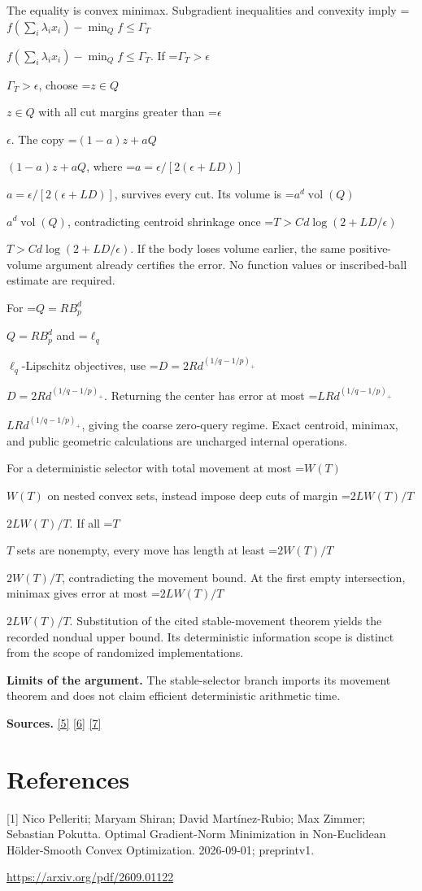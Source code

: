 \documentclass[10pt,a4paper]{article}
\newcommand{\AtlasMath}[1]{\par\begingroup\centering\setbox0=\hbox{$\displaystyle #1$}\ifdim\wd0>1.4\linewidth\typeout{ATLAS WIDE FORMULA: \the\wd0}\fi\ifdim\wd0>\linewidth\resizebox{\linewidth}{!}{\box0}\else\box0\fi\par\endgroup}
\newcommand{\AtlasInlineMath}[1]{\begingroup\setbox0=\hbox{$#1$}\ifdim\wd0>.4\linewidth\endgroup\AtlasMath{#1}\else\endgroup$#1$\fi}
\begin{document}
The equality is convex minimax. Subgradient inequalities and convexity imply
\AtlasInlineMath{f(\sum_i\lambda_ix_i)-\min_Qf\le\Gamma_T}.
If \AtlasInlineMath{\Gamma_T>\epsilon}, choose \AtlasInlineMath{z\in Q} with all cut margins greater than \AtlasInlineMath{\epsilon}. The copy \AtlasInlineMath{(1-a)z+aQ}, where \AtlasInlineMath{a=\epsilon/[2(\epsilon+LD)]}, survives every cut. Its volume is \AtlasInlineMath{a^d\operatorname{vol}(Q)}, contradicting centroid shrinkage once \AtlasInlineMath{T>C d\log(2+LD/\epsilon)}. If the body loses volume earlier, the same positive-volume argument already certifies the error. No function values or inscribed-ball estimate are required.

For \AtlasInlineMath{Q=RB_p^d} and \AtlasInlineMath{\ell_q}-Lipschitz objectives, use \AtlasInlineMath{D=2Rd^{(1/q-1/p)_+}}. Returning the center has error at most \AtlasInlineMath{LRd^{(1/q-1/p)_+}}, giving the coarse zero-query regime. Exact centroid, minimax, and public geometric calculations are uncharged internal operations.

For a deterministic selector with total movement at most \AtlasInlineMath{W(T)} on nested convex sets, instead impose deep cuts of margin \AtlasInlineMath{2LW(T)/T}. If all \AtlasInlineMath{T} sets are nonempty, every move has length at least \AtlasInlineMath{2W(T)/T}, contradicting the movement bound. At the first empty intersection, minimax gives error at most \AtlasInlineMath{2LW(T)/T}. Substitution of the cited stable-movement theorem yields the recorded nondual upper bound. Its deterministic information scope is distinct from the scope of randomized implementations.

\textbf{Limits of the argument.} The stable-selector branch imports its movement theorem and does not claim efficient deterministic arithmetic time.

\textbf{Sources.} \href{https://arxiv.org/pdf/1405.4980}{[5]} \href{https://www2.isye.gatech.edu/~nemirovs/MOR_AccuracyCertificates.pdf}{[6]} \href{https://arxiv.org/pdf/2609.20701}{[7]}

\section{References}
[1] Nico Pelleriti; Maryam Shiran; David Martínez-Rubio; Max Zimmer; Sebastian Pokutta. Optimal Gradient-Norm Minimization in Non-Euclidean Hölder-Smooth Convex Optimization. 2026-09-01; preprintv1.

\url{https://arxiv.org/pdf/2609.01122}
\end{document}
